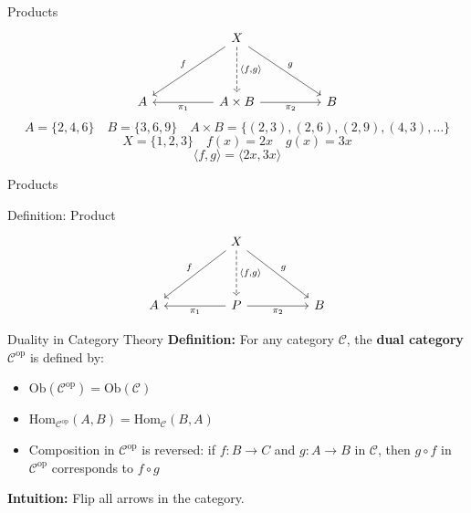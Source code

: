\documentclass[aspectratio=169]{beamer}
\begin{document}
\begin{frame}[fragile]{Products}
  \[
    \begin{tikzcd}[row sep=huge, column sep=huge]
      & X \arrow[dl, "f"'] \arrow[dr, "g"] \arrow[d, dashrightarrow, "{\langle f,g \rangle}"] & \\
      A & A \times B \arrow[l, "\pi_1"] \arrow[r, "\pi_2"'] & B
    \end{tikzcd}
  \]
  \[
    A = \big\{2, 4, 6\big\} \quad B = \big\{3, 6, 9\big\} \quad A \times B = \big\{(2, 3), (2, 6), (2, 9), (4, 3), \dots\big\}
  \]
  \[
    X = \big\{ 1, 2, 3 \big\} \quad f(x) = 2x \quad g(x) = 3x
  \]
  \[
    \langle f, g \rangle = \langle 2x, 3x \rangle
  \]
\end{frame}

\begin{frame}[fragile]{Products}
  \begin{block}{Definition: Product}
  \[
    \begin{tikzcd}[row sep=huge, column sep=huge]
      & X \arrow[dl, "f"'] \arrow[dr, "g"] \arrow[d, dashrightarrow, "{\langle f,g \rangle}"] & \\
      A & { P } \arrow[l, "\pi_1"] \arrow[r, "\pi_2"'] & B
    \end{tikzcd}
  \]
  \end{block}
\end{frame}

\begin{frame}{Duality in Category Theory}
  \textbf{Definition:}  
  For any category \(\mathcal{C}\), the \textbf{dual category} \(\mathcal{C}^{\mathrm{op}}\) is defined by:
  \begin{itemize}
    \item \(\mathrm{Ob}(\mathcal{C}^{\mathrm{op}}) = \mathrm{Ob}(\mathcal{C})\)
    \item \(\mathrm{Hom}_{\mathcal{C}^{\mathrm{op}}}(A,B) = \mathrm{Hom}_{\mathcal{C}}(B,A)\)
    \item Composition in \(\mathcal{C}^{\mathrm{op}}\) is reversed: if \(f: B \to C\) and \(g: A \to B\) in \(\mathcal{C}\), then \(g \circ f\) in \(\mathcal{C}^{\mathrm{op}}\) corresponds to \(f \circ g\)
  \end{itemize}

  \vspace{0.5em}
  \textbf{Intuition:} Flip all arrows in the category.
\end{frame}
\end{document}

